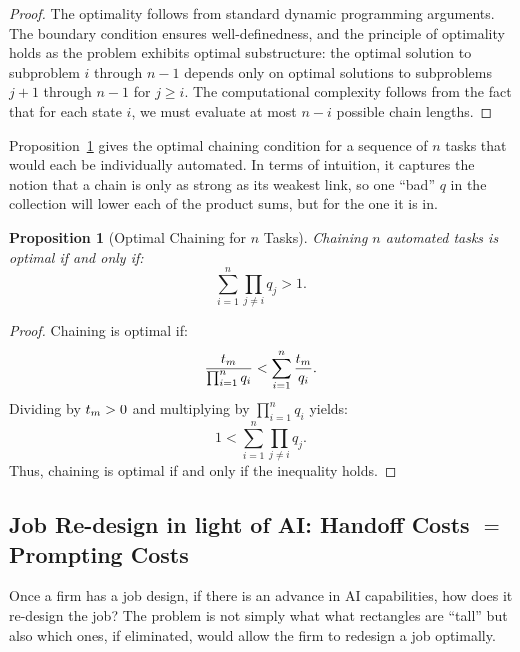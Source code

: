 \documentclass{article}
\theoremstyle{plain}
\theoremstyle{plain}
\newtheorem{proposition}[theorem]{Proposition}
\begin{document}
\begin{proof}
The optimality follows from standard dynamic programming arguments. The boundary condition ensures well-definedness, and the principle of optimality holds as the problem exhibits optimal substructure: the optimal solution to subproblem \(i\) through \(n-1\) depends only on optimal solutions to subproblems \(j+1\) through \(n-1\) for \(j \geq i\). The computational complexity follows from the fact that for each state \(i\), we must evaluate at most \(n-i\) possible chain lengths.
\end{proof}

Proposition~\ref{prop:optimal_chaining} gives the optimal chaining condition for a sequence of \(n\) tasks that would each be individually automated.
In terms of intuition, it captures the notion that a chain is only as strong as its weakest link, so one “bad” \(q\) in the collection will lower each of the product sums, but for the one it is in. 

\begin{proposition}[Optimal Chaining for \(n\) Tasks] \label{prop:optimal_chaining}
Chaining \(n\) automated tasks is optimal if and only if:
\[
\sum_{i=1}^n \prod_{j \neq i} q_j > 1.
\]
\end{proposition}

\begin{proof}
Chaining is optimal if:
\[
\frac{t_{m}}{\prod_{i=1}^n q_i} < \sum_{i=1}^n \frac{t_{m}}{q_i}.
\]
Dividing by \(t_{m} > 0\) and multiplying by \(\prod_{i=1}^n q_i\) yields:
\[
1 < \sum_{i=1}^n \prod_{j \neq i} q_j.
\]
Thus, chaining is optimal if and only if the inequality holds.
\end{proof}

\subsection{Job Re-design in light of AI: Handoff Costs \(=\) Prompting Costs}

Once a firm has a job design, if there is an advance in AI capabilities, how does it re-design the job?
The problem is not simply what what rectangles are “tall” but also which ones, if eliminated, would allow the firm to redesign a job optimally.
\end{document}
